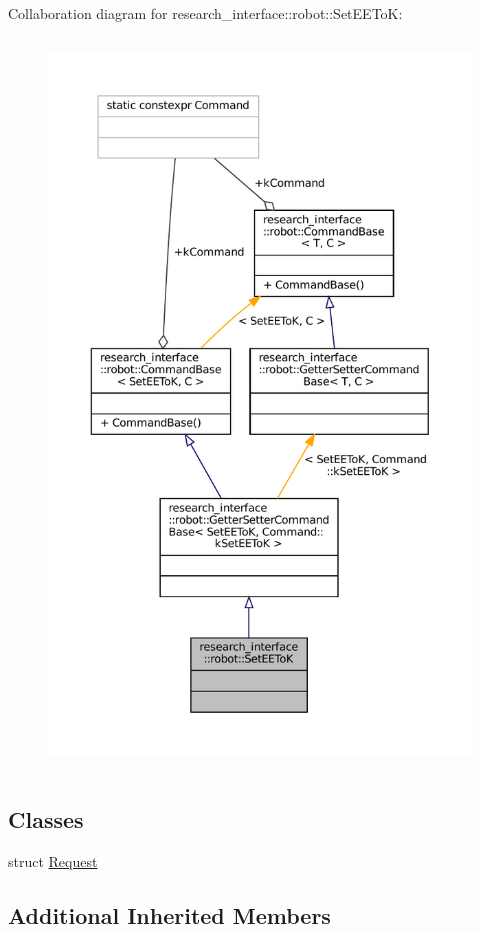 Collaboration diagram for research\+\_\+interface\+:\+:robot\+:\+:Set\+E\+E\+ToK\+:
\nopagebreak
\begin{figure}[H]
\begin{center}
\leavevmode
\includegraphics[height=550pt]{structresearch__interface_1_1robot_1_1SetEEToK__coll__graph}
\end{center}
\end{figure}
\subsection*{Classes}
\begin{DoxyCompactItemize}
\item 
struct \hyperlink{structresearch__interface_1_1robot_1_1SetEEToK_1_1Request}{Request}
\end{DoxyCompactItemize}
\subsection*{Additional Inherited Members}


